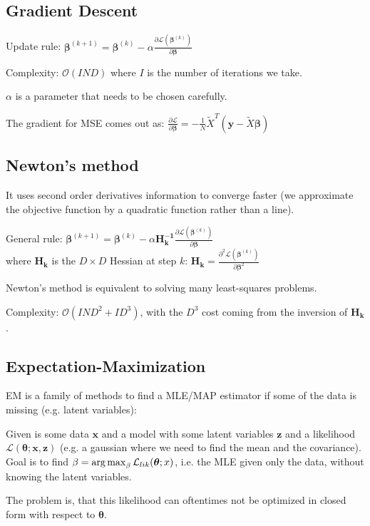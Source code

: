 \documentclass[10pt,a4paper,landscape]{article}
\providecommand{\bf}[1]{\ensuremath{\mathbf{#1}}}
\newcommand{\bbeta}{\boldsymbol\beta}
\newcommand{\btheta}{\boldsymbol\theta}
\begin{document}
\begin{multicols*}{4}
\subsection{Gradient Descent}
Update rule: $\bbeta^{(k+1)} = \bbeta^{(k)} - \alpha \frac{\partial \mathcal{L}(\bbeta^{(k)})}{\partial \bbeta}$

Complexity: $\mathcal{O}(I N D)$ where $I$ is the number of iterations we take.

$\alpha$ is a parameter that needs to be chosen carefully.

The gradient for MSE comes out as:
$\frac{\partial \mathcal{L}}{\partial \bbeta} = - \frac{1}{N} \tilde{X}^T ( \boldsymbol y - \tilde{X} \bbeta )$

\subsection{Newton's method}
It uses second order derivatives information to converge faster (we approximate the objective function by a quadratic function rather than a line).

General rule: $\bbeta^{(k+1)} = \bbeta^{(k)} - \alpha \bf{H_k^{-1}} \frac{\partial \mathcal{L}(\bbeta^{(k)})}{\partial \bbeta}$\\
where $\bf{H_k}$ is the $D \times D$ Hessian at step $k$: $\bf{H_k} = \frac{\partial^2 \mathcal{L}(\bbeta^{(k)})}{\partial \bbeta^2}$

Newton's method is equivalent to solving many least-squares problems.

Complexity: $\mathcal{O}(I N D^2 + I D^3)$, with the $D^3$ cost coming from the inversion of $\bf{H_k}$.

\subsection{Expectation-Maximization}
EM is a family of methods to find a MLE/MAP estimator if some of the data is missing (e.g. latent variables):

Given is some data $\bf{x}$ and  a model with some latent variables $\bf{z}$ and a likelihood $\mathcal{L}(\btheta; \bf{x}, \bf{z})$ (e.g. a gaussian where we need to find the mean and the covariance).
Goal is to find $\beta = \argmax_{\beta} \mathcal{L}_{lik}(\btheta; x)$, i.e. the MLE given only the data, without knowing the latent variables.

The problem is, that this likelihood can oftentimes not be optimized in closed form with respect to $\btheta$.


\end{multicols*}
\end{document}
